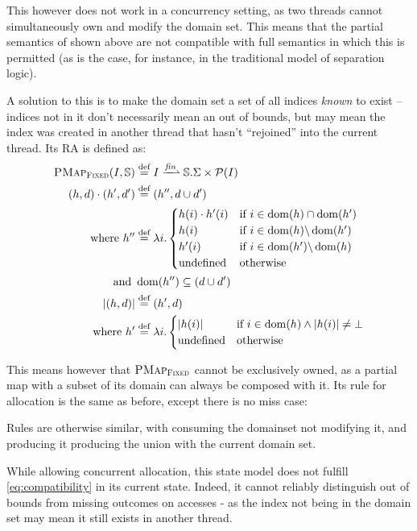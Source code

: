 This however does not work in a concurrency setting, as two threads cannot simultaneously own and modify the domain set. This means that the partial semantics of \alloc{} shown above are not compatible with full semantics in which this is permitted (as is the case, for instance, in the traditional model of separation logic).

A solution to this is to make the domain set a set of all indices \emph{known} to exist -- indices not in it don't necessarily mean an out of bounds, but may mean the index was created in another thread that hasn't ``rejoined'' into the current thread. Its RA is defined as:
\begin{align*}
	\PMap_{\textsc{Fixed}}(I,\mmdl) &\defeq I \finmap \mmdl.\Sigma \times \pset(I)\\
	(h,d)\cdot (h',d') &\defeq (h'', d\cup d') \\
	\text{where } h''&\defeq \lambda i.\begin{cases}
		h(i)\cdot h'(i)&\If~i\in \dom(h)\cap\dom(h')\\
		h(i) &\If~i\in \dom(h) \backslash \dom(h')\\
		h'(i) &\If~i\in \dom(h') \backslash \dom(h)\\
		\text{undefined}&\Otherwise
	\end{cases}\\
	\text{and }& \dom(h'')\subseteq (d\cup d')\\
	|(h, d)| &\defeq (h', d)\\
	\text{where }h'&\defeq \lambda i.\begin{cases}
		|h(i)| &\If~ i\in\dom(h) \land |h(i)| \neq \bot\\
		\text{undefined} &\Otherwise
	\end{cases}
\end{align*}

This means however that $\textsc{PMap}_\textsc{Fixed}$ cannot be exclusively owned, as a partial map with a subset of its domain can always be composed with it. Its rule for allocation is the same as before, except there is no miss case: 

Rules are otherwise similar, with consuming the domainset not modifying it, and producing it producing the union with the current domain set.

While allowing concurrent allocation, this state model does not fulfill \ref{eq:compatibility} in its current state. Indeed, it cannot reliably distinguish out of bounds from missing outcomes on accesses - as the index not being in the domain set may mean it still exists in another thread.

